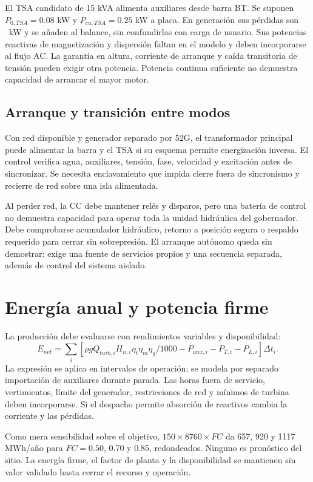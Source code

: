 El TSA candidato de 15 kVA alimenta auxiliares desde barra BT. Se suponen $P_{0,TSA}=0.08$ kW y $P_{cu,TSA}=0.25$ kW a placa. En generación sus pérdidas son \PerdTsa\ kW y se añaden al balance, sin confundirlas con carga de usuario. Sus potencias reactivas de magnetización y dispersión faltan en el modelo y deben incorporarse al flujo AC. La garantía en altura, corriente de arranque y caída transitoria de tensión pueden exigir otra potencia. Potencia continua suficiente no demuestra capacidad de arrancar el mayor motor.

\subsection{Arranque y transición entre modos}
Con red disponible y generador separado por 52G, el transformador principal puede alimentar la barra y el TSA si su esquema permite energización inversa. El control verifica agua, auxiliares, tensión, fase, velocidad y excitación antes de sincronizar. Se necesita enclavamiento que impida cierre fuera de sincronismo y recierre de red sobre una isla alimentada.

Al perder red, la CC debe mantener relés y disparos, pero una batería de control no demuestra capacidad para operar toda la unidad hidráulica del gobernador. Debe comprobarse acumulador hidráulico, retorno a posición segura o respaldo requerido para cerrar sin sobrepresión. El arranque autónomo queda sin demostrar: exige una fuente de servicios propios y una secuencia separada, además de control del sistema aislado.

\section{Energía anual y potencia firme}
La producción debe evaluarse con rendimientos variables y disponibilidad:
\begin{equation}
E_{net}=\sum_i\left[\rho g Q_{turb,i}H_{n,i}\eta_t\eta_m\eta_g/1000
-P_{aux,i}-P_{T,i}-P_{L,i}\right]\Delta t_i.
\end{equation}
La expresión se aplica en intervalos de operación; se modela por separado importación de auxiliares durante parada. Las horas fuera de servicio, vertimientos, límite del generador, restricciones de red y mínimos de turbina deben incorporarse. Si el despacho permite absorción de reactivos cambia la corriente y las pérdidas.

Como mera sensibilidad sobre el objetivo, $150\times8760\times FC$ da 657, 920 y 1117 MWh/año para $FC=0.50$, 0.70 y 0.85, redondeados. Ninguno es pronóstico del sitio. La energía firme, el factor de planta y la disponibilidad se mantienen sin valor validado hasta cerrar el recurso y operación.

